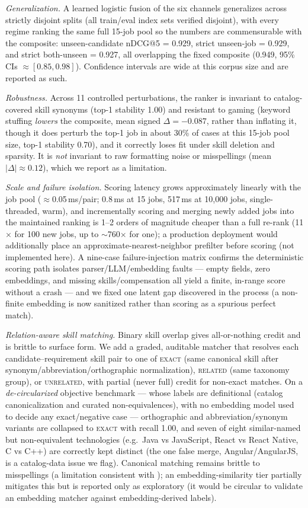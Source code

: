 \emph{Generalization.} A learned logistic fusion of the six channels generalizes across strictly
disjoint splits (all train/eval index sets verified disjoint), with every regime ranking the same
full 15-job pool so the numbers are commensurable with the composite: unseen-candidate nDCG@5 = 0.929,
strict unseen-job = 0.929, and strict both-unseen = 0.927, all overlapping the fixed composite (0.949,
95\% CIs $\approx [0.85, 0.98]$). Confidence intervals are wide at this corpus size and are reported as such.

\emph{Robustness.} Across 11 controlled perturbations, the ranker is invariant to catalog-covered
skill synonyms (top-1 stability 1.00) and resistant to gaming (keyword stuffing \emph{lowers} the
composite, mean signed $\Delta = -0.087$, rather than inflating it, though it does perturb the top-1 job
in about 30\% of cases at this 15-job pool size, top-1 stability 0.70), and it correctly loses fit under
skill deletion and sparsity. It is \emph{not} invariant to raw formatting noise or misspellings
(mean $|\Delta| \approx 0.12$), which we report as a limitation.

\emph{Scale and failure isolation.} Scoring latency grows approximately linearly with the job pool
($\approx$0.05\,ms/pair; 0.8\,ms at 15 jobs, 517\,ms at 10{,}000 jobs, single-threaded, warm), and
incrementally scoring and merging newly added jobs into the maintained ranking is 1--2 orders of
magnitude cheaper than a full re-rank (11$\times$ for 100 new jobs, up to $\sim$760$\times$ for one); a
production deployment would additionally place an approximate-nearest-neighbor prefilter before
scoring (not implemented here). A nine-case failure-injection matrix confirms the deterministic
scoring path isolates parser/LLM/embedding faults --- empty fields, zero embeddings, and missing
skills/compensation all yield a finite, in-range score without a crash --- and we fixed one latent
gap discovered in the process (a non-finite embedding is now sanitized rather than scoring as a
spurious perfect match).

\emph{Relation-aware skill matching.} Binary skill overlap gives all-or-nothing credit and is brittle to
surface form. We add a graded, auditable matcher that resolves each candidate--requirement skill pair to
one of \textsc{exact} (same canonical skill after synonym/abbreviation/orthographic normalization),
\textsc{related} (same taxonomy group), or \textsc{unrelated}, with partial (never full) credit for
non-exact matches. On a \emph{de-circularized} objective benchmark --- whose labels are definitional
(catalog canonicalization and curated non-equivalences), with no embedding model used to decide any
exact/negative case --- orthographic and abbreviation/synonym variants are collapsed to \textsc{exact}
with recall 1.00, and seven of eight similar-named but non-equivalent technologies (e.g.\ Java vs
JavaScript, React vs React Native, C vs C++) are correctly kept distinct (the one false merge,
Angular/AngularJS, is a catalog-data issue we flag). Canonical matching remains brittle to misspellings
(a limitation consistent with ); an embedding-similarity tier partially mitigates this but
is reported only as exploratory (it would be circular to validate an embedding matcher against
embedding-derived labels).

